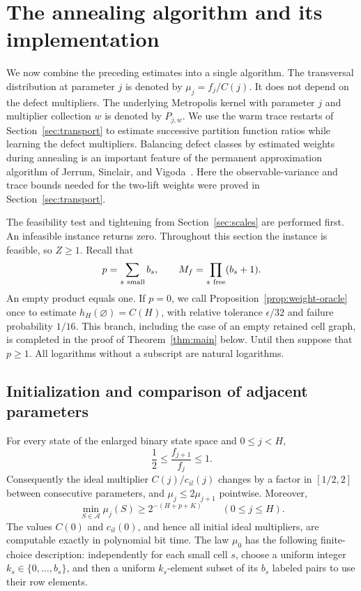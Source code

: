 \section{The annealing algorithm and its implementation}
\label{sec:algorithm}

We now combine the preceding estimates into a single algorithm.  The
transversal distribution at parameter \(j\) is denoted by
\(\mu_j=f_j/C(j)\).  It does not depend on the defect multipliers.
The underlying Metropolis kernel with parameter \(j\) and multiplier
collection \(w\) is denoted by \(P_{j,w}\).  We use the warm trace
restarts of Section~\ref{sec:transport} to estimate successive partition
function ratios while learning the defect multipliers. Balancing
defect classes by estimated weights during annealing is an important
feature of the permanent approximation algorithm of Jerrum, Sinclair,
and Vigoda~\cite[Section~3]{JSV2004}. Here the observable-variance and trace bounds
needed for the two-lift weights were proved in
Section~\ref{sec:transport}.

The feasibility test and tightening from Section~\ref{sec:scales} are
performed first.  An infeasible instance returns zero.  Throughout this
section the instance is feasible, so \(Z\geq 1\).  Recall that
\[
 p=\sum_{s\ {\rm small}}b_s,
 \qquad
 M_f=\prod_{s\ {\rm free}}(b_s+1).
\]
An empty product equals one.  If \(p=0\), we call
Proposition~\ref{prop:weight-oracle} once to estimate
\(h_H(\varnothing)=C(H)\), with relative tolerance \(\epsilon/32\)
and failure probability \(1/16\).  This branch, including the case of
an empty retained cell graph, is completed in the proof of
Theorem~\ref{thm:main} below.  Until then suppose that \(p\geq 1\).
All logarithms without a subscript are natural logarithms.

\subsection{Initialization and comparison of adjacent parameters}

\begin{lemma}
\label{lem:initialization}
For every state of the enlarged binary state space and
\(0\leq j<H\),
\begin{equation}
 \frac12\leq\frac{f_{j+1}}{f_j}\leq 1.
 \label{eq:alg-adjacent}
\end{equation}
Consequently the ideal multiplier \(C(j)/c_{il}(j)\) changes by a
factor in \([1/2,2]\) between consecutive parameters, and
\(\mu_j\leq 2\mu_{j+1}\) pointwise.  Moreover,
\begin{equation}
 \min_{S\in\mathcal A}\mu_j(S)
 \geq 2^{-(H+p+K)}
 \qquad (0\leq j\leq H).
 \label{eq:alg-minimum-mass}
\end{equation}
The values \(C(0)\) and \(c_{il}(0)\), and hence all initial ideal
multipliers, are computable exactly in polynomial bit time.  The law
\(\mu_0\) has the following finite-choice description: independently
for each small cell \(s\), choose a uniform integer
\(k_s\in\{0,\ldots,b_s\}\), and then a uniform \(k_s\)-element subset
of its \(b_s\) labeled pairs to use their row elements.
\end{lemma}

